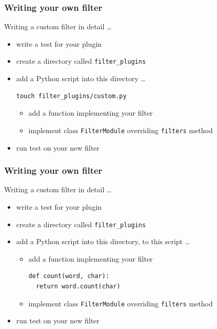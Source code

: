 \documentclass[pdf]{beamer}
\begin{document}
\begin{frame}[t,fragile]
  \frametitle{Writing your own filter}
  Writing a custom filter in detail \ldots
  \begin{itemize}
    \item {write a test for your plugin}
    \item {create a directory called \texttt{filter\_plugins}}
    \item \alert {add a Python script into this directory \ldots}
      \begin{lstlisting}
touch filter_plugins/custom.py
      \end{lstlisting}
      \begin{itemize}
        \item {add a function implementing your filter}
        \item {implement class \texttt{FilterModule} overriding \texttt{filters} method}
      \end{itemize}
    \item {run test on your new filter}
  \end{itemize}
\end{frame}

\begin{frame}[t,fragile]
  \frametitle{Writing your own filter}
  Writing a custom filter in detail \ldots
  \begin{itemize}
    \item {write a test for your plugin}
    \item {create a directory called \texttt{filter\_plugins}}
    \item {add a Python script into this directory, to this script \ldots}
      \begin{itemize}
        \item \alert {add a function implementing your filter}
          \begin{lstlisting}
def count(word, char):
  return word.count(char)
          \end{lstlisting}
        \item {implement class \texttt{FilterModule} overriding \texttt{filters} method}
      \end{itemize}
    \item {run test on your new filter}
  \end{itemize}
\end{frame}
\end{document}
